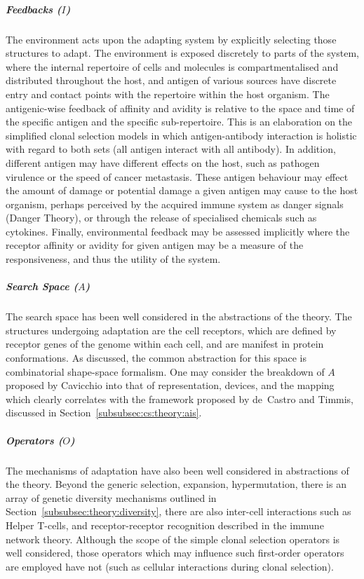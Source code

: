 \subparagraph{Feedbacks ($I$)} The environment acts upon the adapting system by explicitly selecting those structures to adapt. The environment is exposed discretely to parts of the system, where the internal repertoire of cells and molecules is compartmentalised and distributed throughout the host, and antigen of various sources have discrete entry and contact points with the repertoire within the host organism. The antigenic-wise feedback of affinity and avidity is relative to the space and time of the specific antigen and the specific sub-repertoire. This is an elaboration on the simplified clonal selection models in which antigen-antibody interaction is holistic with regard to both sets (all antigen interact with all antibody). In addition, different antigen may have different effects on the host, such as pathogen virulence or the speed of cancer metastasis. These antigen behaviour may effect the amount of damage or potential damage a given antigen may cause to the host organism, perhaps perceived by the acquired immune system as danger signals (Danger Theory), or through the release of specialised chemicals such as cytokines. Finally, environmental feedback may be assessed implicitly where the receptor affinity or avidity for given antigen may be a measure of the responsiveness, and thus the utility of the system.

\subparagraph{Search Space ($A$)} The search space has been well considered in the abstractions of the theory. The structures undergoing adaptation are the cell receptors, which are defined by receptor genes of the genome within each cell, and are manifest in protein conformations. As discussed, the common abstraction for this space is combinatorial shape-space formalism. One may consider the breakdown of $A$ proposed by Cavicchio into that of representation, devices, and the mapping which clearly correlates with the framework proposed by de~Castro and Timmis, discussed in Section~\ref{subsubsec:cs:theory:ais}.

\subparagraph{Operators ($O$)} The mechanisms of adaptation have also been well considered in abstractions of the theory. Beyond the generic selection, expansion, hypermutation, there is an array of genetic diversity mechanisms outlined in Section~\ref{subsubsec:theory:diversity}, there are also inter-cell interactions such as Helper T-cells, and receptor-receptor recognition described in the immune network theory. Although the scope of the simple clonal selection operators is well considered, those operators which may influence such first-order operators are employed have not (such as cellular interactions during clonal selection).

